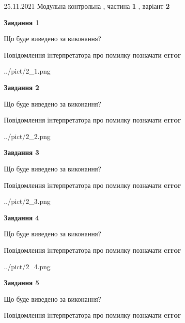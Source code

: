 \documentclass[10pt, ukrainian]{article}
\begin{document}
{25.11.2021 Модульна контрольна , частина \textbf { 1 }, варіант  \No \textbf { 2 }\par}
{
\begin {large}

{\begin {center}\textbf{Завдання 1}\end {center}}\par
Що буде виведено за виконання? \par
Повідомлення інтерпретатора про помилку позначати \textbf{error}

\begin{center}
	{../pict/2_1.png}
\end{center}
\newpage

{\begin {center}\textbf{Завдання 2}\end {center}}\par
Що буде виведено за виконання? \par
Повідомлення інтерпретатора про помилку позначати \textbf{error}

\begin{center}
	{../pict/2_2.png}
\end{center}
\newpage

{\begin {center}\textbf{Завдання 3}\end {center}}\par
Що буде виведено за виконання? \par
Повідомлення інтерпретатора про помилку позначати \textbf{error}

\begin{center}
	{../pict/2_3.png}
\end{center}
\newpage

{\begin {center}\textbf{Завдання 4}\end {center}}\par
Що буде виведено за виконання? \par
Повідомлення інтерпретатора про помилку позначати \textbf{error}

\begin{center}
	{../pict/2_4.png}
\end{center}
\newpage

{\begin {center}\textbf{Завдання 5}\end {center}}\par
Що буде виведено за виконання? \par
Повідомлення інтерпретатора про помилку позначати \textbf{error}


\end{large}}
\end{document}
